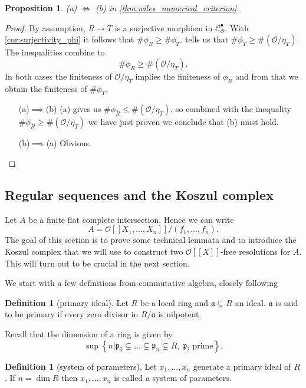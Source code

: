 \documentclass{article}
\theoremstyle{plain}%
\newtheorem{proposition}[theorem]{Proposition}
\theoremstyle{definition}
\newtheorem{definition}[theorem]{Definition}
\theoremstyle{remark}
\newcommand{\cob}{\mathcal{C}_\mathcal{O}^\bullet}
\begin{document}
\begin{proposition}\textup{\cite[cf.][corollary 5.6]{Darmon1995}}\label{prop:aequalsb}
    (a) \(\Leftrightarrow\) (b) in \cref{thm:wiles_numerical_criterion}.
\end{proposition}
\begin{proof}
    By assumption, \(R \to T\) is a surjective morphism in \(\cob\).
    With \cref{cor:surjectivity_phi} it follows that \(\#\phi_R \geq \#\phi_T\).  
    tells us that \(\#\phi_T \geq \#(\mathcal{O}/\eta_T)\).
    The inequalities combine to \[\#\phi_R \geq \#(\mathcal{O}/\eta_T).\]
    In both cases the finiteness of \(\mathcal{O}/\eta_T\) implies the finiteness of \(\phi_R\)
    and from that we obtain the finiteness of \(\#\phi_T\).
    \begin{itemize}
        \item[(a)\(\implies\)(b)] (a) gives us \(\#\phi_R \leq \#(\mathcal{O}/\eta_T)\), so combined with the 
        inequality \(\#\phi_R \geq \#(\mathcal{O}/\eta_T)\) we have just proven we conclude that (b) must hold.
        \item[(b)\(\implies\)(a)] Obvious.
    \end{itemize}      
\end{proof}

\subsection{Regular sequences and the Koszul complex}
Let \(A\) be a finite flat complete intersection. Hence we can write 
\[A = \mathcal{O}[[X_1, \dots, X_n]]/(f_1, \dots, f_n).\]
The goal of this section is to prove some technical lemmata and to introduce
the Koszul complex that we will use to construct two \(\mathcal{O}[[X]]\)-free resolutions for \(A\).
This will turn out to be crucial in the next section.

We start with a few definitions from commutative algebra, closely following \cite[sec. 5.3]{Darmon1995}
\begin{definition}[primary ideal]
    Let \(R\) be a local ring and \(\mathfrak{a} \subsetneq R\) an ideal. 
    \(\mathfrak{a}\) is said to be primary if every zero divisor in \(R/\mathfrak{a}\) is nilpotent.
\end{definition}
Recall that the dimension of a ring is given by
\[
    \sup \left\{n | 
                \mathfrak{p}_0 \subsetneq \dots \subsetneq \mathfrak{p}_n \subsetneq R,\; \mathfrak{p}_i \text{ prime} 
        \right\}.
\]
\begin{definition}[system of parameters]
    Let \(x_1, \dots, x_n\) generate a primary ideal of \(R\). If \(n = \dim R\) then \(x_1, \dots, x_n\) is called 
    a system of parameters.
\end{definition}
\end{document}
